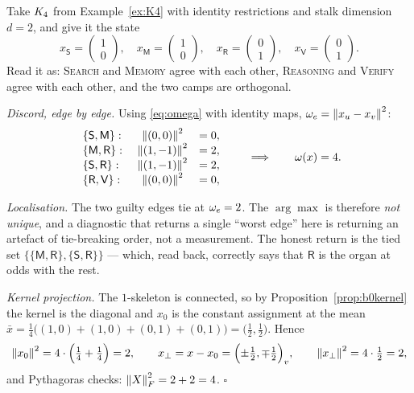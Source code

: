 \begin{workedbox}\Worked
Take $K_4$ from Example~\ref{ex:K4} with identity restrictions and
stalk dimension $d=2$, and give it the state
\[
  x_{\mathsf S}=\begin{pmatrix}1\\0\end{pmatrix},\quad
  x_{\mathsf M}=\begin{pmatrix}1\\0\end{pmatrix},\quad
  x_{\mathsf R}=\begin{pmatrix}0\\1\end{pmatrix},\quad
  x_{\mathsf V}=\begin{pmatrix}0\\1\end{pmatrix}.
\]
Read it as: \textsc{Search} and \textsc{Memory} agree with each other,
\textsc{Reasoning} and \textsc{Verify} agree with each other, and the two
camps are orthogonal.

\medskip
\emph{Discord, edge by edge.} Using \eqref{eq:omega} with identity maps,
$\omega_e=\left\lVert x_u-x_v \right\rVert^2$:
\[
\begin{array}{lcl}
  \{\mathsf S,\mathsf M\}:&\ \left\lVert (0,0) \right\rVert^2 &= 0,\\
  \{\mathsf M,\mathsf R\}:&\ \left\lVert (1,-1) \right\rVert^2 &= 2,\\
  \{\mathsf S,\mathsf R\}:&\ \left\lVert (1,-1) \right\rVert^2 &= 2,\\
  \{\mathsf R,\mathsf V\}:&\ \left\lVert (0,0) \right\rVert^2 &= 0,
\end{array}
\qquad\Longrightarrow\qquad \omega(x)=4 .
\]

\emph{Localisation.} The two guilty edges tie at $\omega_e=2$. The
$\arg\max$ is therefore \emph{not unique}, and a diagnostic that returns
a single ``worst edge'' here is returning an artefact of tie-breaking
order, not a measurement. The honest return is the tied set
$\{\{\mathsf M,\mathsf R\},\{\mathsf S,\mathsf R\}\}$ --- which, read
back, correctly says that $\mathsf R$ is the organ at odds with the rest.

\emph{Kernel projection.} The $1$-skeleton is connected, so by
Proposition~\ref{prop:b0kernel} the kernel is the diagonal and $x_0$ is
the constant assignment at the mean
$\bar x=\tfrac14\bigl((1,0)+(1,0)+(0,1)+(0,1)\bigr)
 =\bigl(\tfrac12,\tfrac12\bigr)$.
Hence
\[
  \left\lVert x_0 \right\rVert^2=4\cdot\Bigl(\tfrac14+\tfrac14\Bigr)=2,
  \qquad
  x_\perp = x-x_0
  =\Bigl(\pm\tfrac12,\mp\tfrac12\Bigr)_{v},
  \qquad
  \left\lVert x_\perp \right\rVert^2=4\cdot\tfrac12=2,
\]
and Pythagoras checks: $\left\lVert X \right\rVert_F^2=2+2=4$. \hfill$\square$
\end{workedbox}

